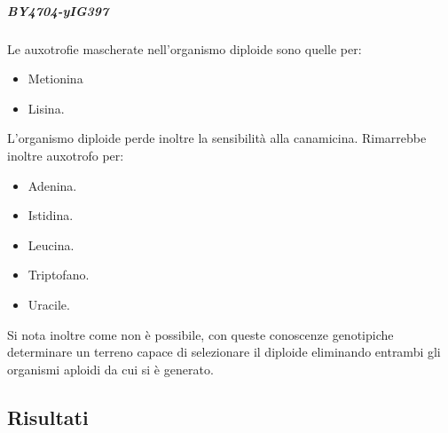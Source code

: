 				\subparagraph*{\emph{BY4704-yIG397}}
				Le auxotrofie mascherate nell'organismo diploide sono quelle per:
				\begin{multicols}{2}
					\begin{itemize}
						\item Metionina
						\item Lisina.
					\end{itemize}
				\end{multicols}
				L'organismo diploide perde inoltre la sensibilit\`a alla canamicina.
				Rimarrebbe inoltre auxotrofo per:
				\begin{multicols}{4}
					\begin{itemize}
						\item Adenina.
						\item Istidina.
						\item Leucina.
						\item Triptofano.
						\item Uracile.
					\end{itemize}
				\end{multicols}
				Si nota inoltre come non \`e possibile, con queste conoscenze genotipiche determinare un terreno capace di selezionare il diploide eliminando entrambi gli organismi aploidi da cui si \`e generato.
\subsection*{Risultati}
	
